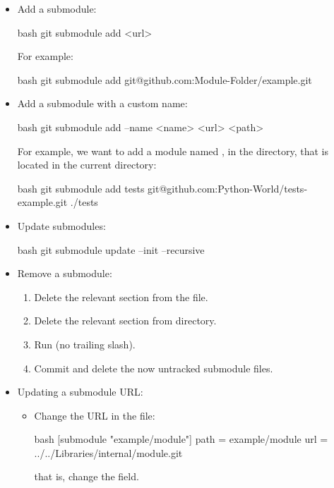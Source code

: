 \begin{itemize}
    \item Add a submodule:
    \begin{mintedbox}{bash}
git submodule add <url>
    \end{mintedbox}
    For example:
    \begin{mintedbox}{bash}
git submodule add git@github.com:Module-Folder/example.git
    \end{mintedbox}
    \item Add a submodule with a custom name:
    \begin{mintedbox}{bash}
git submodule add --name <name> <url> <path>
    \end{mintedbox}
    For example, we want to add a module named , in the
     directory, that is located in the current
    directory:
    \begin{mintedbox}{bash}
git submodule add tests git@github.com:Python-World/tests-example.git ./tests
    \end{mintedbox}
    \item Update submodules:
    \begin{mintedbox}{bash}
git submodule update --init --recursive
    \end{mintedbox}
    \item Remove a submodule:
    \begin{enumerate}
        \item Delete the relevant section from the  file.
        \item Delete the relevant section from  directory.
        \item Run  (no trailing slash).
        \item Commit and delete the now untracked submodule files.
    \end{enumerate}
    \item Updating a submodule URL:
    \begin{itemize}
        \item Change the URL in the  file:
        \begin{mintedbox}{bash}
[submodule "example/module"]
    path = example/module
    url = ../../Libraries/internal/module.git
        \end{mintedbox}
        that is, change the  field.

\end{itemize}
\end{itemize}
